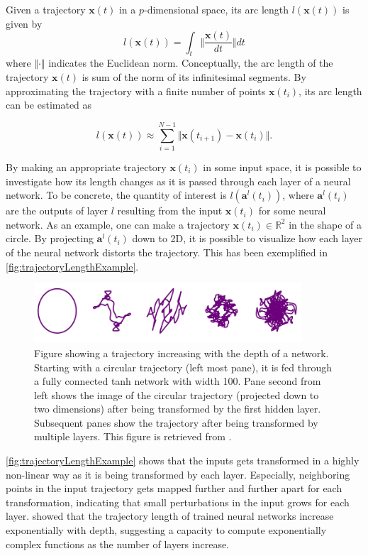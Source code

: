 Given a trajectory $\boldsymbol{x}(t)$ in a $p$-dimensional space, its arc length 
$l(\boldsymbol{x}(t))$ is given by
\begin{equation}
   l(\boldsymbol{x}(t)) = 
   \int_{t} \big\Vert \frac{\boldsymbol{x}(t)}{dt} \big\Vert dt
\end{equation}
where $\Vert \cdot\Vert$ indicates the Euclidean norm. Conceptually, the arc length of the trajectory $\boldsymbol{x}(t)$ is sum of the norm of its infinitesimal segments. By approximating the trajectory with a finite number of points $\boldsymbol{x}(t_i)$, its arc length can be estimated as 

\begin{equation}\label{eq:TrajectoryLengthDiscrete}
   l(\boldsymbol{x}(t)) \approx 
   \sum_{i=1}^{N-1} \Vert\boldsymbol{x}(t_{i+1}) - \boldsymbol{x}(t_{i})\Vert.
\end{equation}

By making an appropriate trajectory $\boldsymbol{x}(t_i)$ in some input space, it is possible to investigate how its length changes as it is passed through each layer of a neural network. To be concrete, the quantity of interest is $l(\boldsymbol{a}^{l}(t_i))$, where $\boldsymbol{a}^{l}(t_i)$ are the outputs of layer $l$ resulting from the input $\boldsymbol{x}(t_i)$ for some neural network. As an example, one can make a trajectory $\boldsymbol{x}(t_i) \in \mathbb{R}^2$ in the shape of a circle. By projecting $\boldsymbol{a}^{l}(t_i)$ down to 2D, it is possible to visualize how each layer of the neural network distorts the trajectory. This has been exemplified in \autoref{fig:trajectoryLengthExample}.

\begin{figure}[H]
    \centering
    \includegraphics[width=10cm]{latex/figures/trajectoryLengthExample.PNG}
    \caption{Figure showing a trajectory increasing with the depth
of a network. Starting with a circular trajectory (left most
pane), it is fed through a fully connected tanh network with
width 100. Pane second from left shows the image of the circular
trajectory (projected down to two dimensions) after being transformed by the first hidden layer. Subsequent panes show the trajectory after being transformed by multiple layers. This figure is retrieved from \citet{raghu2017expressive}.}
\label{fig:trajectoryLengthExample}
\end{figure}

\autoref{fig:trajectoryLengthExample} shows that the inputs gets transformed in a highly non-linear way as it is being transformed by each layer. Especially, neighboring points in the input trajectory gets mapped further and further apart for each transformation, indicating that small perturbations in the input grows for each layer. \citet{raghu2017expressive} showed that the trajectory length of trained neural networks increase exponentially with depth, suggesting a capacity to compute exponentially complex functions as the number of layers increase.

